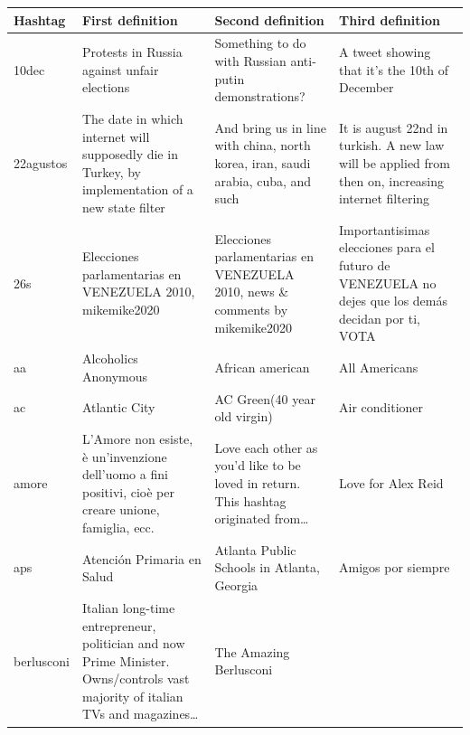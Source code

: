 \documentclass[a4paper,11pt,oneside]{article}
\begin{document}
\begin{table}[h]
\centering
    \begin{tabular}{ | l | p{4cm} | p{4cm} | p{4cm} |}
    \hline
Hashtag & First definition & Second definition & Third definition \\ \hline
10dec & \footnotesize{Protests in Russia against unfair elections} & \footnotesize{Something to do with Russian anti-putin demonstrations?} & \footnotesize{A tweet showing that it's the 10th of December}\\
22agustos & \footnotesize{The date in which internet will supposedly die in Turkey, by implementation of a new state filter} & \footnotesize{And bring us in line with china, north korea, iran, saudi arabia, cuba, and such} & \footnotesize{It is august 22nd in turkish. A new law will be applied from then on, increasing internet filtering}\\
26s & \footnotesize{Elecciones parlamentarias en VENEZUELA 2010, mikemike2020} & \footnotesize{Elecciones parlamentarias en VENEZUELA 2010, news \& comments by mikemike2020} & \footnotesize{Importantisimas elecciones para el futuro de VENEZUELA no dejes que los demás decidan por ti, VOTA}\\
aa & \footnotesize{Alcoholics Anonymous} & \footnotesize{African american } & \footnotesize{All Americans}\\
ac & \footnotesize{Atlantic City} & \footnotesize{AC Green(40 year old virgin)} &  \footnotesize{Air conditioner}\\
amore & \footnotesize{L'Amore non esiste, è un'invenzione dell'uomo a fini positivi, cioè per creare unione, famiglia, ecc. } & \footnotesize{Love each other as you'd like to be loved in return. This hashtag originated from\dots} & \footnotesize{Love for Alex Reid}\\
aps & \footnotesize{Atención Primaria en Salud} & \footnotesize{Atlanta Public Schools in Atlanta, Georgia} & \footnotesize{Amigos por siempre}\\
berlusconi & \footnotesize{Italian long-time entrepreneur, politician and now Prime Minister. Owns/controls vast majority of italian TVs and magazines\dots} & \footnotesize{The Amazing Berlusconi} & \footnotesize{}\\

\end{tabular}
\end{table}
\end{document}
